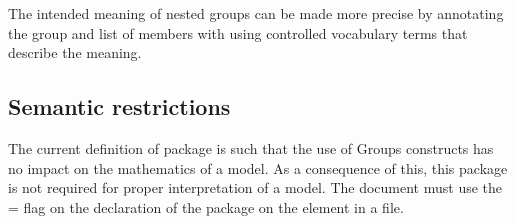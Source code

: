 The intended meaning of nested groups can be made more precise by annotating the group and list of members with  using controlled vocabulary terms that describe the meaning.


\subsection{Semantic restrictions}
\label{semantic-restrictions}

The current definition of  package is such that the use of Groups constructs has no impact on the mathematics of a model.  As a consequence of this, this package is not required for proper interpretation of a model. The document must use the = flag on the declaration of the package on the  element in a file.

